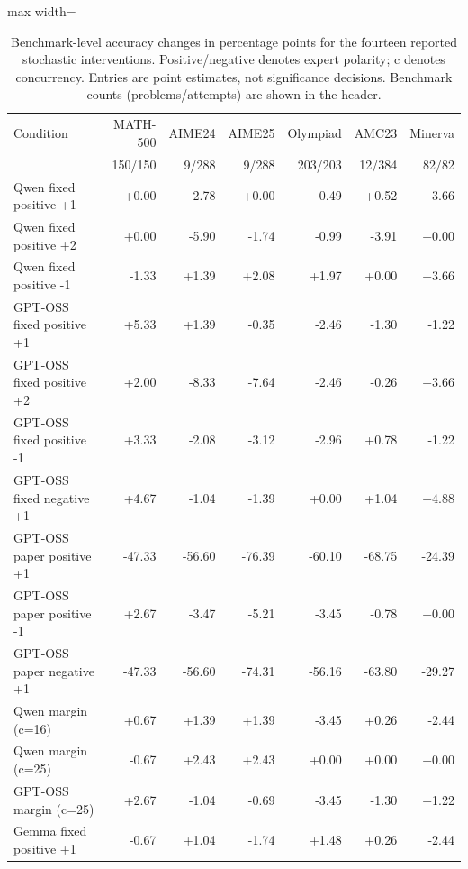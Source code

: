 \documentclass[12pt,a4paper,twoside,openright]{book}
\begin{document}
\begin{table}[!ht]
\centering\small
\caption{Benchmark-level accuracy changes in percentage points for the fourteen reported stochastic interventions. Positive/negative denotes expert polarity; c denotes concurrency. Entries are point estimates, not significance decisions. Benchmark counts (problems/attempts) are shown in the header.}
\label{tab:res-benchmark-changes}
\begin{adjustbox}{max width=\linewidth}%
\begin{tabular}{lrrrrrr}
\toprule
Condition & MATH-500 & AIME24 & AIME25 & Olympiad & AMC23 & Minerva \\ & 150/150 & 9/288 & 9/288 & 203/203 & 12/384 & 82/82 \\
\midrule
Qwen fixed positive +1 & +0.00 & -2.78 & +0.00 & -0.49 & +0.52 & +3.66 \\
Qwen fixed positive +2 & +0.00 & -5.90 & -1.74 & -0.99 & -3.91 & +0.00 \\
Qwen fixed positive -1 & -1.33 & +1.39 & +2.08 & +1.97 & +0.00 & +3.66 \\
GPT-OSS fixed positive +1 & +5.33 & +1.39 & -0.35 & -2.46 & -1.30 & -1.22 \\
GPT-OSS fixed positive +2 & +2.00 & -8.33 & -7.64 & -2.46 & -0.26 & +3.66 \\
GPT-OSS fixed positive -1 & +3.33 & -2.08 & -3.12 & -2.96 & +0.78 & -1.22 \\
GPT-OSS fixed negative +1 & +4.67 & -1.04 & -1.39 & +0.00 & +1.04 & +4.88 \\
GPT-OSS paper positive +1 & -47.33 & -56.60 & -76.39 & -60.10 & -68.75 & -24.39 \\
GPT-OSS paper positive -1 & +2.67 & -3.47 & -5.21 & -3.45 & -0.78 & +0.00 \\
GPT-OSS paper negative +1 & -47.33 & -56.60 & -74.31 & -56.16 & -63.80 & -29.27 \\
Qwen margin (c=16) & +0.67 & +1.39 & +1.39 & -3.45 & +0.26 & -2.44 \\
Qwen margin (c=25) & -0.67 & +2.43 & +2.43 & +0.00 & +0.00 & +0.00 \\
GPT-OSS margin (c=25) & +2.67 & -1.04 & -0.69 & -3.45 & -1.30 & +1.22 \\
Gemma fixed positive +1 & -0.67 & +1.04 & -1.74 & +1.48 & +0.26 & -2.44 \\
\bottomrule
\end{tabular}
\end{adjustbox}
\end{table}
\end{document}

